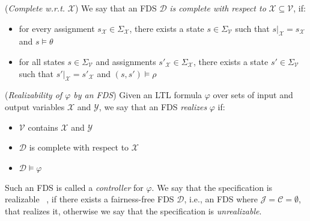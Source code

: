 \begin{definition}
	\label{def:completeFDS} (\emph{Complete w.r.t.} $\mathcal{X}$)
	We say that an FDS $\mathcal{D}$ \emph{is complete with respect to} $\mathcal{X} \subseteq \mathcal{V}$, if:
	\begin{itemize}
		\item for every assignment $s_{\mathcal{X}} \in \Sigma_{\mathcal{X}}$, there exists a state $s \in \Sigma_{\mathcal{V}}$ such that $s|_{\mathcal{X}} = s_{\mathcal{X}}$ and $s \models \theta$
		\item for all states $s \in \Sigma_{\mathcal{V}}$ and assignments $s'_{\mathcal{X}} \in \Sigma_{\mathcal{X}}$, there exists a state $s' \in \Sigma_{\mathcal{V}}$ such that $s'|_{\mathcal{X}}=s'_{\mathcal{X}}$ and $(s,s') \models \rho$
	\end{itemize}
\end{definition}


\begin{definition}
	\label{def:realizabilityFDS} (\emph{Realizability of $\varphi$ by an FDS})
	Given an LTL formula $\varphi$ over sets of input and output variables $\mathcal{X}$ and $\mathcal{Y}$, we say that an FDS \fdsDef \emph{realizes} $\varphi$ if:
	\begin{itemize}
		\item $\mathcal{V}$ contains $\mathcal{X}$ and $\mathcal{Y}$ 
		\item $\mathcal{D}$ is complete with respect to $\mathcal{X}$
		\item $\mathcal{D} \models \varphi$
	\end{itemize}
	Such an FDS is called a \emph{controller} for $\varphi$. We say that the specification is realizable ~\cite{pnueli1989synthesis}, if there exists a fairness-free FDS $\mathcal{D}$, i.e., an FDS where $\mathcal{J} =\mathcal{C} = \emptyset$, that realizes it, otherwise we say that the specification is \emph{unrealizable}.
\end{definition}